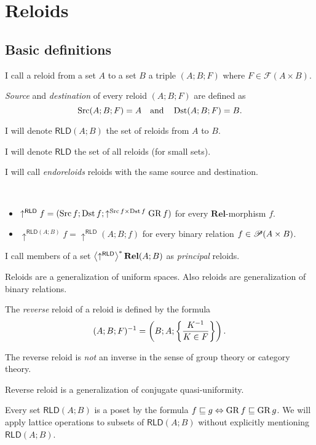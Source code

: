 
\chapter{Reloids}


\section{Basic definitions}
\begin{defn}
I call a reloid from a set $A$ to a set $B$ a triple
$(A;B;F)$ where $F\in\mathscr{F}(A\times B)$.
\end{defn}

\begin{defn}
\emph{Source} and
\emph{destination} of every reloid $(A;B;F)$ are defined as
\[
\operatorname{Src}(A;B;F)=A\quad\text{and}\quad\operatorname{Dst}(A;B;F)=B.
\]

\end{defn}
I will denote $\mathsf{RLD}(A;B)$ the set of reloids from $A$ to
$B$.

I will denote $\mathsf{RLD}$ the set of all reloids (for small sets).

\begin{defn}
I will call \emph{endoreloids} reloids with the
same source and destination.
\end{defn}

\begin{defn}
~
\begin{itemize}
\item $\uparrow^{\mathsf{RLD}}f=(\operatorname{Src} f;\operatorname{Dst} f;\uparrow^{\operatorname{Src} f\times\operatorname{Dst} f}\operatorname{GR} f)$
for every $\mathbf{Rel}$-morphism $f$.
\item $\uparrow^{\mathsf{RLD}(A;B)}f=\uparrow^{\mathsf{RLD}}(A;B;f)$ for
every binary relation $f\in\mathscr{P}(A\times B)$.
\end{itemize}
\end{defn}

\begin{defn}
I call members of a set $\left\langle \uparrow^{\mathsf{RLD}}\right\rangle ^{\ast}\mathbf{Rel}(A;B)$
as \emph{principal} reloids.
\end{defn}

Reloids are a generalization of uniform spaces. Also reloids are generalization
of binary relations.
\begin{defn}
The \emph{reverse} reloid of a reloid is defined
by the formula
\[
(A;B;F)^{-1}=\left(B;A;\left\{ \frac{K^{-1}}{K\in F}\right\}\right).
\]
\end{defn}
\begin{note}
The reverse reloid is \emph{not} an inverse in the sense of group
theory or category theory.
\end{note}
Reverse reloid is a generalization of conjugate quasi-uniformity.
\begin{defn}
Every set $\mathsf{RLD}(A;B)$ is a poset by the formula $f\sqsubseteq g\Leftrightarrow\operatorname{GR} f\sqsubseteq\operatorname{GR} g$.
We will apply lattice operations to subsets of $\mathsf{RLD}(A;B)$
without explicitly mentioning $\mathsf{RLD}(A;B)$.\end{defn}

